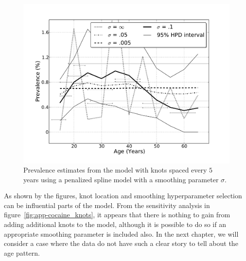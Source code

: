     \begin{figure}[h]
        \begin{center}
            \includegraphics[width=\textwidth]{applications/cocaine_dependence-smoothing.pdf}
            \caption{Prevalence estimates from the model with knots spaced every $5$ years
              using a penalized spline model with a smoothing
              parameter $\sigma$. }
        \label{fig:app-cocaine_smoothing}
        \end{center}
    \end{figure}

As shown by the figures, knot location and smoothing
hyperparameter selection can be influential parts of the model.
From the sensitivity analysis in figure~\ref{fig:app-cocaine_knots},
it appears that there is nothing to gain from adding additional
knots to the model, although it is possible to do so if an appropriate
smoothing parameter is included also.  In the next chapter, we will
consider a case where the data do not have such a clear story to
tell about the age pattern.
